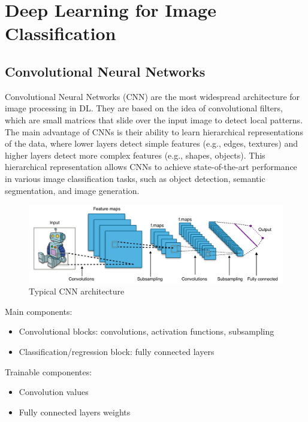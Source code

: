 \chapter{Deep Learning for Image Classification}

\section{Convolutional Neural Networks}
Convolutional Neural Networks (CNN) are the most widespread architecture
for image processing in DL. They are based on the idea of convolutional
filters, which are small matrices that slide over the input image to
detect local patterns. The main advantage of CNNs is their ability to
learn hierarchical representations of the data, where lower layers
detect simple features (e.g., edges, textures) and higher layers
detect more complex features (e.g., shapes, objects). This hierarchical
representation allows CNNs to achieve state-of-the-art performance in
various image classification tasks, such as object detection,
semantic segmentation, and image generation.

\begin{figure}[htbp]
   \centering
   \includegraphics{images/10/cnn.png}
   \caption{Typical CNN architecture}
   \label{fig:10/cnn}
\end{figure}

Main components:
\begin{itemize}
	\item Convolutional blocks: convolutions, activation functions, subsampling
	\item Classification/regression block: fully connected layers
\end{itemize}
Trainable componentes:
\begin{itemize}
	\item Convolution values
	\item Fully connected layers weights
\end{itemize}

